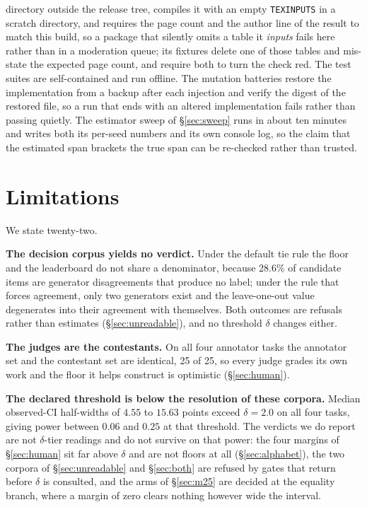 \documentclass{article}
\begin{document}
directory outside the release tree, compiles it with an empty \texttt{TEXINPUTS} in a scratch directory, and requires the page count and the author line of the result to match this build, so a package that silently omits a table it \emph{inputs} fails here rather than in a moderation queue; its fixtures delete one of those tables and mis-state the expected page count, and require both to turn the check red. The test suites are self-contained and run offline. The mutation batteries restore the implementation from a backup after each injection and verify the digest of the restored file, so a run that ends with an altered implementation fails rather than passing quietly. The estimator sweep of \S\ref{sec:sweep} runs in about ten minutes and writes both its per-seed numbers and its own console log, so the claim that the estimated span brackets the true span can be re-checked rather than trusted.
\section{Limitations}
\label{sec:limits} We state twenty-two.

\textbf{The decision corpus yields no verdict.} Under the default tie rule the floor and the leaderboard do not share a denominator, because 28.6\% of candidate items are generator disagreements that produce no label; under the rule that forces agreement, only two generators exist and the leave-one-out value degenerates into their agreement with themselves. Both outcomes are refusals rather than estimates (\S\ref{sec:unreadable}), and no threshold $\delta$ changes either.

\textbf{The judges are the contestants.} On all four annotator tasks the annotator set and the contestant set are identical, 25 of 25, so every judge grades its own work and the floor it helps construct is optimistic (\S\ref{sec:human}).

\textbf{The declared threshold is below the resolution of these corpora.} Median observed-CI half-widths of $4.55$ to $15.63$ points exceed $\delta = 2.0$ on all four tasks, giving power between $0.06$ and $0.25$ at that threshold. The verdicts we do report are not $\delta$-tier readings and do not survive on that power: the four margins of \S\ref{sec:human} sit far above $\delta$ and are not floors at all (\S\ref{sec:alphabet}), the two corpora of \S\ref{sec:unreadable} and \S\ref{sec:both} are refused by gates that return before $\delta$ is consulted, and the arms of \S\ref{sec:m25} are decided at the equality branch, where a margin of zero clears nothing however wide the interval.
\end{document}

